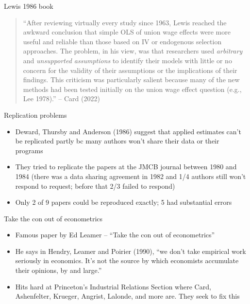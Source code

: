 \documentclass{beamer}
\begin{document}
\begin{frame}{Lewis 1986 book}

\begin{quote}
``After reviewing virtually every study since 1963, Lewis reached the awkward conclusion that simple OLS of union wage effects were more useful and reliable than those based on IV or endogenous selection approaches. The problem, in his view, was that researchers used \emph{arbitrary} and \emph{unsupported assumptions} to identify their models with little or no concern for the validity of their assumptions or the implications of their findings. This criticism was particularly salient because many of the new methods had been tested initially on the union wage effect question (e.g., Lee 1978).'' -- Card (2022)
\end{quote}

\end{frame}

\begin{frame}{Replication problems}

\begin{itemize}
\item Deward, Thursby and Anderson (1986) suggest that applied estimates can't be replicated partly bc many authors won't share their data or their programs
\item They tried to replicate the papers at the JMCB journal between 1980 and 1984 (there was a data sharing agreement in 1982 and 1/4 authors still won't respond to request; before that 2/3 failed to respond)
\item Only 2 of 9 papers could be reproduced exactly; 5 had substantial errors
\end{itemize}

\end{frame}

\begin{frame}{Take the con out of econometrics}

\begin{itemize}
\item Famous paper by Ed Leamer -- ``Take the con out of econometrics''
\item He says in Hendry, Leamer and Poirier (1990), ``we don't take empirical work seriously in economics. It's not the source by which economists accumulate their opinions, by and large.''
\item Hits hard at Princeton's Industrial Relations Section where Card, Ashenfelter, Krueger, Angrist, Lalonde, and more are. They seek to fix this
\end{itemize}

\end{frame}
\end{document}

